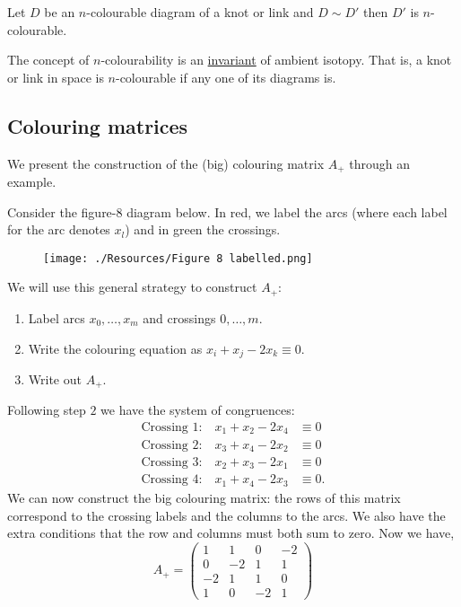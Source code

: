 \documentclass[12pt, a4paper]{article}
\begin{document}
\begin{theorem}
    Let \(D\) be an \(n\)-colourable diagram of a knot or link and \(D \sim D'\) then \(D'\) is \(n\)-colourable.
\end{theorem}

\begin{mdprop}
    The concept of \(n\)-colourability is an \underline{invariant} of ambient isotopy. That is, a knot or link in space is \(n\)-colourable if any one of its diagrams is.
\end{mdprop}

\subsection{Colouring matrices}

We present the construction of the (big) colouring matrix \(A_+\) through an example.

\begin{example}
    Consider the figure-\(8\) diagram below. In red, we label the arcs (where each label for the arc denotes \(x_l\)) and in green the crossings. 
    \begin{figure}[H]
        \begin{center}
            \texttt{[image: ./Resources/Figure 8 labelled.png]}
        \end{center}
    \end{figure}
    We will use this general strategy to construct \(A_+\):
    \begin{enumerate}
        \item Label arcs \(x_0,\ldots,x_m\) and crossings \(0,\ldots, m\). 
        \item Write the colouring equation as \(x_i+x_j-2x_k \equiv 0\).
        \item Write out \(A_+\).
    \end{enumerate}
    Following step \(2\) we have the system of congruences:
    \[\begin{aligned}
        \text{Crossing \(1\):}  \quad x_1+x_2-2x_4 &\equiv 0 \\
        \text{Crossing \(2\):} \quad x_3+x_4-2x_2 &\equiv 0 \\
        \text{Crossing \(3\):}  \quad x_2+x_3-2x_1 &\equiv 0 \\
        \text{Crossing \(4\):}  \quad x_1+x_4-2x_3 &\equiv 0.
    \end{aligned}\]
    We can now construct the big colouring matrix: the rows of this matrix correspond to the crossing labels and the columns to the arcs. We also have the extra conditions that the row and columns must both sum to zero. Now we have,
    \[A_+ = \begin{pmatrix} 1 & 1 & 0 & -2 \\ 0 & -2 & 1 & 1 \\ -2 & 1 & 1 & 0 \\ 1 & 0 & -2 & 1 \end{pmatrix}\]
\end{example}
\end{document}
